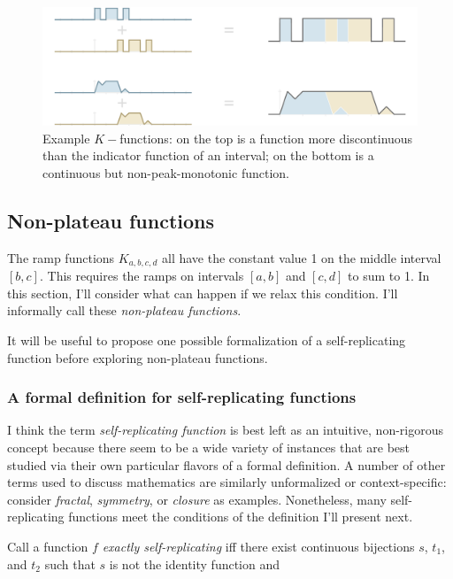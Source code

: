 \documentclass[]{article}
\begin{document}
\begin{figure}[htbp]
\centering
\includegraphics{images/pdfs/other_ramps2.pdf}
\caption{\label{fig:other_ramps}Example \(K-\)functions: on the top is a
function more discontinuous than the indicator function of an interval;
on the bottom is a continuous but non-peak-monotonic
function.}\label{fig:otherux5framps}
\end{figure}

\subsection{Non-plateau functions}\label{non-plateau-functions}

The ramp functions \(K_{a,b,c,d}\) all have the constant value 1 on the
middle interval \([b, c]\). This requires the ramps on intervals
\([a, b]\) and \([c, d]\) to sum to 1. In this section, I'll consider
what can happen if we relax this condition. I'll informally call these
\emph{non-plateau functions}.

It will be useful to propose one possible formalization of a
self-replicating function before exploring non-plateau functions.

\subsubsection{A formal definition for self-replicating
functions}\label{a-formal-definition-for-self-replicating-functions}

I think the term \emph{self-replicating function} is best left as an
intuitive, non-rigorous concept because there seem to be a wide variety
of instances that are best studied via their own particular flavors of a
formal definition. A number of other terms used to discuss mathematics
are similarly unformalized or context-specific: consider \emph{fractal},
\emph{symmetry}, or \emph{closure} as examples. Nonetheless, many
self-replicating functions meet the conditions of the definition I'll
present next.

Call a function \(f\) \emph{exactly self-replicating} iff there exist
continuous bijections \(s\), \(t_1\), and \(t_2\) such that \(s\) is not
the identity function and
\end{document}
